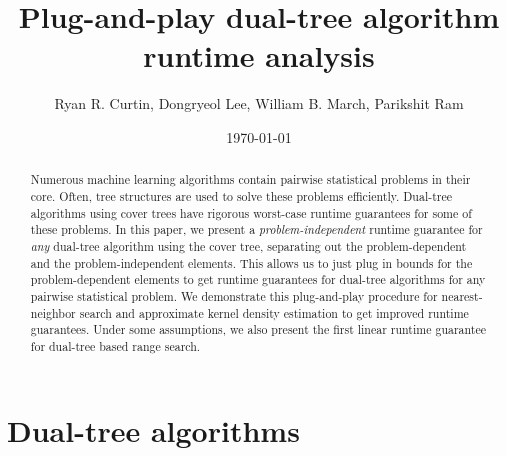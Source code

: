 \documentclass{article} %
\title{Plug-and-play dual-tree algorithm runtime analysis}
\author{Ryan R. Curtin, Dongryeol Lee, William B. March, Parikshit Ram}
\date{\today}
\begin{document}
\maketitle

\begin{abstract}
Numerous machine learning algorithms contain pairwise statistical
problems in their core. Often, tree structures are used
to solve these problems efficiently. Dual-tree
algorithms using cover trees have
rigorous worst-case runtime guarantees for some of these problems. In this paper, we present a {\em
problem-independent} runtime guarantee for {\em any} dual-tree
algorithm using the cover tree, separating out the problem-dependent and
the problem-independent elements. This allows us to just plug in
bounds for the problem-dependent elements to get runtime guarantees
for dual-tree algorithms for any pairwise statistical problem. We
demonstrate this plug-and-play procedure for nearest-neighbor search
and approximate kernel density estimation to get improved runtime
guarantees.  Under some assumptions, we also present the first linear runtime
guarantee for dual-tree based range search.
\end{abstract}


\section{Dual-tree algorithms}
\end{document}
